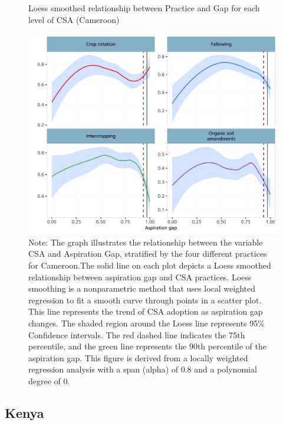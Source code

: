 \documentclass[
]{article}
\begin{document}
\begin{figure}[htbp]
\centering
\caption{Loess smoothed relationship between Practice and Gap for each level of CSA (Cameroon)}
\includegraphics[width=\textwidth]{figures/fig_NP_cam.pdf}

\caption*{
Note: The graph illustrates the relationship between the variable CSA and Aspiration Gap, stratified by the four different practices for Cameroon.The solid line on each plot depicts a Loess smoothed relationship between aspiration gap and CSA practices. Loess smoothing is a nonparametric method that uses local weighted regression to fit a smooth curve through points in a scatter plot. This line represents the trend of CSA adoption as aspiration gap changes. The shaded region around the Loess line represents 95\% Confidence intervals. The red dashed line indicates the 75th percentile, and the green line represents the 90th percentile of the aspiration gap. This figure is derived from a locally weighted regression analysis with a span (alpha) of 0.8 and a polynomial degree of 0. 
}
\end{figure}

\newpage

\hypertarget{kenya}{%
\subsection{Kenya}\label{kenya}}
\end{document}
